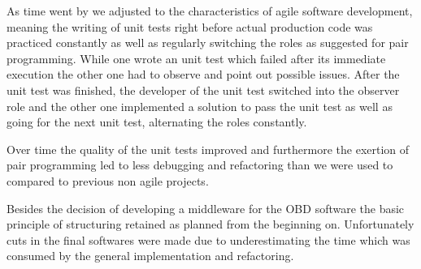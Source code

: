 As time went by we adjusted to the characteristics of agile software development, meaning the writing of unit tests right before actual 
production code was practiced constantly as well as regularly switching the roles as suggested for pair programming. While one wrote an unit 
test which failed after its immediate execution the other one had to observe and point out possible issues. After the unit test was finished, 
the developer of the unit test switched into the observer role and the other one implemented a solution to pass the unit test as well as going 
for the next unit test, alternating the roles constantly.

Over time the quality of the unit tests improved and furthermore the exertion of pair programming led to less debugging and refactoring than 
we were used to compared to previous non agile projects.

Besides the decision of developing a middleware for the OBD software the basic principle of structuring retained as planned from the beginning 
on. Unfortunately cuts in the final softwares were made due to underestimating the time which was consumed by the general implementation and 
refactoring.

